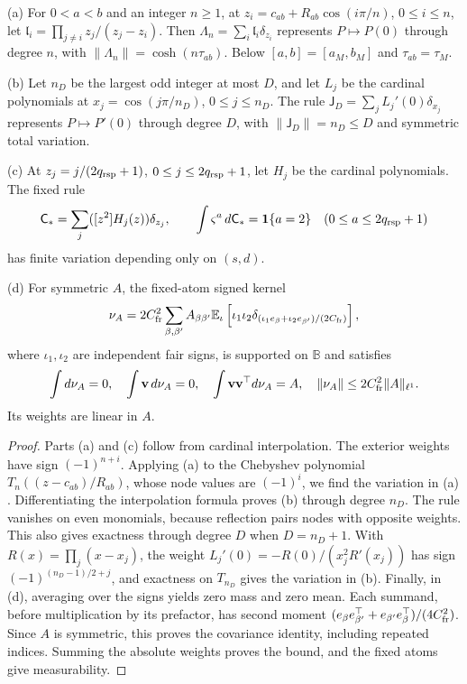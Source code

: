 \begin{lemma}\label{lem:finite-rules}
\textup{(a)} For $0<a<b$ and an integer $n\ge1$, at
$z_i=c_{ab}+R_{ab}\cos(i\pi/n)$, $0\le i\le n$,
let $\mathfrak l_i=\prod_{j\ne i}z_j/(z_j-z_i)$.
Then $\Lambda_n=\sum_i\mathfrak l_i\delta_{z_i}$ represents $P\mapsto P(0)$
through degree $n$, with $\|\Lambda_n\|=\cosh(n\tau_{ab})$.
Below $[a,b]=[a_M,b_M]$ and $\tau_{ab}=\tau_M$.

\textup{(b)} Let $n_D$ be the largest odd integer at most $D$,
and let $L_j$ be the cardinal polynomials at
$x_j=\cos(j\pi/n_D)$, $0\le j\le n_D$. The rule
$\mathsf J_D=\sum_jL_j'(0)\delta_{x_j}$ represents $P\mapsto P'(0)$
through degree $D$, with $\|\mathsf J_D\|=n_D\le D$ and
symmetric total variation.

\textup{(c)} At $z_j=j/(2q_{\rm rsp}+1)$, $0\le j\le2q_{\rm rsp}+1$,
let $H_j$ be the cardinal polynomials. The fixed rule
\begin{equation}\label{eq:LB-loc-nodes}
 \mathsf C_*=\sum_j([z^2]H_j(z))\delta_{z_j},\qquad
 \int\varsigma^a\,d\mathsf C_*=\mathbf 1\{a=2\}\quad(0\le a\le2q_{\rm rsp}+1)
\end{equation}
has finite variation depending only on $(s,d)$.

\textup{(d)} For symmetric $A$, the fixed-atom signed kernel
\begin{equation}\label{eq:LB-covariance-measure}
 \nu_A=2C_{\rm fr}^2\sum_{\beta,\beta'}A_{\beta\beta'}
 \mathbb E_{\iota}\left[\iota_1\iota_2
 \delta_{(\iota_1e_\beta+\iota_2e_{\beta'})/(2C_{\rm fr})}\right],
\end{equation}
where $\iota_1,\iota_2$ are independent fair signs, is supported on
$\mathbb B$ and satisfies
\begin{equation}\label{eq:LB-covariance-moments}
 \int d\nu_A=0,\quad \int\mathbf v\,d\nu_A=0,\quad
 \int\mathbf v\mathbf v^\top d\nu_A=A,\quad
 \|\nu_A\|\le2C_{\rm fr}^2\|A\|_{\ell^1}.
\end{equation}
Its weights are linear in $A$.
\end{lemma}

\begin{proof}
Parts (a) and (c) follow from cardinal interpolation. The exterior
weights have sign $(-1)^{n+i}$. Applying (a) to the Chebyshev
polynomial $T_n((z-c_{ab})/R_{ab})$, whose node values are $(-1)^i$, we
find the variation in (a)
\cite[Section~2.7, Theorem~2.20 and equation~(2.37)]{Rivlin1990}. Differentiating the
interpolation formula proves (b) through degree $n_D$. The rule
vanishes on even monomials, because reflection pairs nodes with
opposite weights. This also gives exactness through degree $D$ when
$D=n_D+1$.
With $R(x)=\prod_j(x-x_j)$, the weight
$L_j'(0)=-R(0)/(x_j^2R'(x_j))$ has sign $(-1)^{(n_D-1)/2+j}$, and
exactness on $T_{n_D}$ gives the variation in (b). Finally, in (d),
averaging over the signs yields zero mass and zero mean. Each summand,
before multiplication by its prefactor, has second moment
$(e_\beta e_{\beta'}^\top+e_{\beta'}e_\beta^\top)/(4C_{\rm fr}^2)$.
Since $A$ is symmetric, this proves the covariance identity, including
repeated indices. Summing the absolute weights proves the bound, and
the fixed atoms give measurability.
\end{proof}

